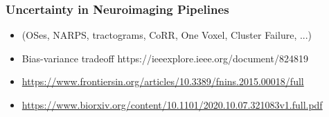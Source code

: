 \subsubsection{Uncertainty in Neuroimaging Pipelines}
\begin{itemize}
\item (OSes, NARPS, tractograms, CoRR, One Voxel, Cluster Failure, ...)
\item Bias-variance tradeoff https://ieeexplore.ieee.org/document/824819
\item \url{https://www.frontiersin.org/articles/10.3389/fnins.2015.00018/full}
\item \url{https://www.biorxiv.org/content/10.1101/2020.10.07.321083v1.full.pdf}
\end{itemize}

